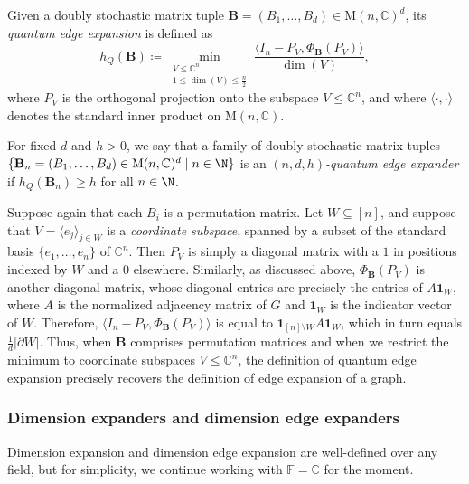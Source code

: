 \documentclass{toc}
\theoremstyle{plain}
\numberwithin{equation}{section}
\theoremstyle{definition}
\newcommand{\F}{\mathbb{F}}
\newcommand{\bC}{\mathbb{C}}
\newcommand{\ab}[1]{\left\lvert#1\right\rvert}
\newcommand{\M}{\mathrm{M}}
\newcommand{\tuple}[1]{\mathbf{#1}}
\newcommand{\vB}{\tuple{B}}
\begin{document}
\begin{definition}
    Given a doubly stochastic matrix tuple $\vB =(B_1,\dots,B_d) \in \M(n,\bC)^d$, its \emph{quantum edge expansion} is defined as
    \begin{equation}\label{eq: quantum edge expansion}
    h_Q(\vB)\coloneqq \min_{\substack{V\leq \bC^n\\ 1\leq\dim(V)\leq \frac n2}}\frac{\langle 
    I_n-P_V,\Phi_\vB(P_V)\rangle}{\dim(V)},
    \end{equation}
    where $P_V$ is the orthogonal projection onto the subspace $V\leq \bC^n$, and where $\langle \cdot,\cdot\rangle$ denotes the standard inner product on $\M(n,\bC)$.
    
    For fixed $d$ and $h>0$, we say that a family of doubly stochastic matrix tuples $\{\vB_n=(B_1, \dots, B_d)\in \M(n, \bC)^d\mid n\in \N\}$ is an \emph{$(n,d,h)$-quantum edge expander} if $h_Q(\vB_n)\geq h$ for all $n\in\N$. 
\end{definition}
Suppose again that each $B_i$ is a permutation matrix. Let $W \subseteq [n]$, and suppose that $V = \langle e_j\rangle_{j \in W}$ is a \emph{coordinate subspace}, spanned by a subset of the standard basis $\{e_1,\dots,e_n\}$ of $\bC^n$. Then $P_V$ is simply a diagonal matrix with a $1$ in positions indexed by $W$ and a $0$ elsewhere. Similarly, as discussed above, $\Phi_\vB(P_V)$ is another diagonal matrix, whose diagonal entries are precisely the entries of $A\mathbf 1_W$, where $A$ is the normalized adjacency matrix of $G$ and $\mathbf 1_W$ is the indicator vector of $W$. Therefore, $\langle I_n-P_V, \Phi_\vB(P_V) \rangle$ is equal to $\mathbf 1_{[n] \setminus W} A \mathbf 1_W$, which in turn equals $\frac 1 d \ab{\partial W}$. Thus, when $\vB$ comprises permutation matrices and when we restrict the minimum to coordinate subspaces $V \leq \bC^n$, the definition of quantum edge expansion precisely recovers the definition of edge expansion of a graph.

\subsubsection{Dimension expanders and dimension edge expanders}\label{subsec:dim_exp}
Dimension expansion and dimension edge expansion are well-defined over any field, but for simplicity, we continue working with $\F=\bC$ for the moment.
\end{document}
